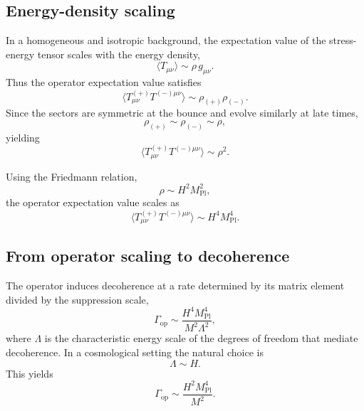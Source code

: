 \documentclass[11pt,a4paper]{article}
\begin{document}
\subsection{Energy-density scaling}

In a homogeneous and isotropic background, the expectation value of the stress-energy
tensor scales with the energy density,
\begin{equation}
    \langle T_{\mu\nu} \rangle \sim \rho\, g_{\mu\nu}.
\end{equation}
Thus the operator expectation value satisfies
\begin{equation}
    \langle T^{(+)}_{\mu\nu} T^{(-)\mu\nu} \rangle
    \sim \rho_{(+)} \rho_{(-)}.
\end{equation}
Since the sectors are symmetric at the bounce and evolve similarly at late times,
\begin{equation}
    \rho_{(+)} \sim \rho_{(-)} \sim \rho,
\end{equation}
yielding
\begin{equation}
    \langle T^{(+)}_{\mu\nu} T^{(-)\mu\nu} \rangle \sim \rho^{2}.
\end{equation}

Using the Friedmann relation,
\begin{equation}
    \rho \sim H^{2} M_{\mathrm{Pl}}^{2},
\end{equation}
the operator expectation value scales as
\begin{equation}
    \langle T^{(+)}_{\mu\nu} T^{(-)\mu\nu} \rangle
    \sim H^{4} M_{\mathrm{Pl}}^{4}.
\end{equation}

\subsection{From operator scaling to decoherence}

The operator induces decoherence at a rate determined by its matrix element divided by
the suppression scale,
\begin{equation}
    \Gamma_{\mathrm{op}}
    \sim \frac{H^{4} M_{\mathrm{Pl}}^{4}}{M^{2} \Lambda^{2}},
\end{equation}
where $\Lambda$ is the characteristic energy scale of the degrees of freedom that mediate
decoherence. In a cosmological setting the natural choice is
\begin{equation}
    \Lambda \sim H.
\end{equation}
This yields
\begin{equation}
    \Gamma_{\mathrm{op}}
    \sim \frac{H^{2} M_{\mathrm{Pl}}^{4}}{M^{2}}.
\end{equation}
\end{document}
